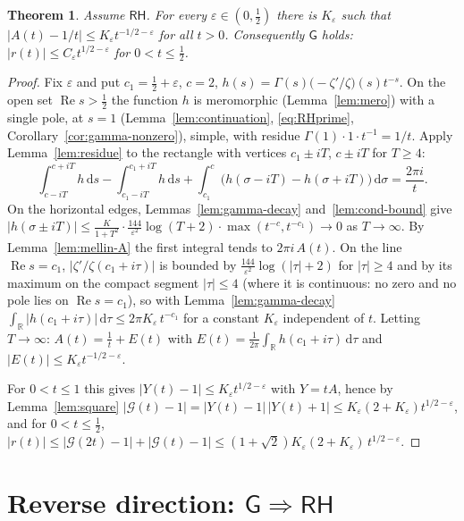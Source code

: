 \documentclass[11pt]{article}
\newtheorem{theorem}{Theorem}[section]
\theoremstyle{definition}
\newcommand{\R}{\mathbb{R}}
\newcommand{\re}{\operatorname{Re}}
\newcommand{\G}{\mathcal{G}}
\newcommand{\RH}{\mathsf{RH}}
\newcommand{\GR}{\mathsf{G}}
\newcommand{\dd}{\,\mathrm{d}}
\begin{document}
\begin{theorem}\label{thm:forward}
Assume $\RH$. For every $\varepsilon\in(0,\tfrac12)$ there is $K_\varepsilon$ such that
$|A(t)-1/t|\le K_\varepsilon t^{-1/2-\varepsilon}$ for all $t>0$.
Consequently $\GR$ holds: $|r(t)|\le C_\varepsilon t^{1/2-\varepsilon}$ for $0<t\le\tfrac12$.
\end{theorem}
\begin{proof}
Fix $\varepsilon$ and put $c_1=\tfrac12+\varepsilon$, $c=2$, $h(s)=\Gamma(s)\bigl(-\zeta'/\zeta\bigr)(s)t^{-s}$.
On the open set $\re s>\tfrac12$ the function $h$ is meromorphic (Lemma~\ref{lem:mero}) with a single pole, at $s=1$ (Lemma~\ref{lem:continuation}, \eqref{eq:RHprime}, Corollary~\ref{cor:gamma-nonzero}), simple, with residue $\Gamma(1)\cdot1\cdot t^{-1}=1/t$.
Apply Lemma~\ref{lem:residue} to the rectangle with vertices $c_1\pm iT$, $c\pm iT$ for $T\ge4$:
\[
\int_{c-iT}^{c+iT}h\dd s-\int_{c_1-iT}^{c_1+iT}h\dd s+\int_{c_1}^{c}\bigl(h(\sigma-iT)-h(\sigma+iT)\bigr)\dd\sigma=\frac{2\pi i}{t}.
\]
On the horizontal edges, Lemmas~\ref{lem:gamma-decay} and~\ref{lem:cond-bound} give
$|h(\sigma\pm iT)|\le\frac{K}{1+T^{2}}\cdot\frac{144}{\varepsilon^{2}}\log(T+2)\cdot\max(t^{-c},t^{-c_1})\to0$ as $T\to\infty$.
By Lemma~\ref{lem:mellin-A} the first integral tends to $2\pi i\,A(t)$.
On the line $\re s=c_1$, $|\zeta'/\zeta(c_1+i\tau)|$ is bounded by $\frac{144}{\varepsilon^2}\log(|\tau|+2)$ for $|\tau|\ge4$ and by its maximum on the compact segment $|\tau|\le4$ (where it is continuous: no zero and no pole lies on $\re s=c_1$), so with Lemma~\ref{lem:gamma-decay}
$\int_\R|h(c_1+i\tau)|\dd\tau\le 2\pi K_\varepsilon\,t^{-c_1}$ for a constant $K_\varepsilon$ independent of $t$.
Letting $T\to\infty$: $A(t)=\frac1t+E(t)$ with $E(t)=\frac1{2\pi}\int_\R h(c_1+i\tau)\dd\tau$ and $|E(t)|\le K_\varepsilon t^{-1/2-\varepsilon}$.

For $0<t\le1$ this gives $|Y(t)-1|\le K_\varepsilon t^{1/2-\varepsilon}$ with $Y=tA$, hence by Lemma~\ref{lem:square}
$|\G(t)-1|=|Y(t)-1|\,|Y(t)+1|\le K_\varepsilon(2+K_\varepsilon)t^{1/2-\varepsilon}$, and for $0<t\le\tfrac12$,
$|r(t)|\le|\G(2t)-1|+|\G(t)-1|\le (1+\sqrt2)K_\varepsilon(2+K_\varepsilon)\,t^{1/2-\varepsilon}$.
\end{proof}

\section{Reverse direction: \texorpdfstring{$\GR\Rightarrow\RH$}{G implies RH}}\label{sec:reverse}
\end{document}
